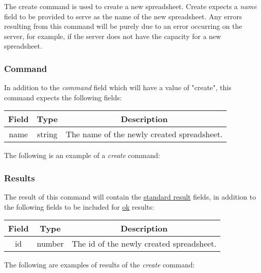 The create command is used to create a new spreadsheet. Create expects a \emph{name} 
field to be provided to serve as the name of the new spreadsheet. Any errors 
resulting from this command will be purely due to an error occurring on the 
server, for example, if the server does not have the capacity for a new 
spreadsheet.

\subsubsection{Command}

In addition to the \emph{command} field which will have a value of "create", this command expects the following fields:
\begin{table}[h!]
    \begin{center}
        \begin{tabular}{|c|c|c|}\hline
            Field & Type & Description \\\hline
            name & string & The name of the newly created spreadsheet. \\\hline
        \end{tabular}
    \end{center}
\end{table}

The following is an example of a \emph{create} command:


\subsubsection{Results}
The result of this command will contain the \hyperref[sec:message:result]{standard result} fields, in addition to the following fields to be included for \underline{ok} results:
\begin{table}[h!]
    \begin{center}
        \begin{tabular}{|c|c|c|}\hline
            Field & Type & Description \\\hline
            id & number & The id of the newly created spreadsheet. \\\hline
        \end{tabular}
    \end{center}
\end{table}

The following are examples of results of the \emph{create} command:




